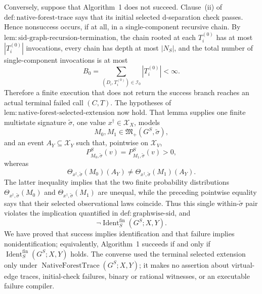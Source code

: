 Conversely, suppose that Algorithm~1 does not succeed.  Clause~(ii) of \(\mathrm{def:native\text{-}forest\text{-}trace}\) says that its initial selected d-separation check passes.  Hence nonsuccess occurs, if at all, in a single-component recursive chain.  By \(\mathrm{lem:sid\text{-}graph\text{-}recursion\text{-}termination}\), the chain rooted at each \(T_i^{(0)}\) has at most \(|T_i^{(0)}|\) invocations, every chain has depth at most \(|N_S|\), and the total number of single-component invocations is at most
\[
 B_0=\sum_{(D_i,T_i^{(0)})\in\mathcal I_0}|T_i^{(0)}|<\infty.
\]
Therefore a finite execution that does not return the success branch reaches an actual terminal failed call \((C,T)\).  The hypotheses of \(\mathrm{lem:native\text{-}forest\text{-}selected\text{-}extension}\) now hold.  That lemma supplies one finite multistate signature \(\widetilde\sigma\), one value \(x^\dagger\in\mathcal X_X\), models
\[
 M_0,M_1\in\mathfrak M_+(G^S,\widetilde\sigma),
\]
and an event \(A_Y\subseteq\mathcal X_Y\) such that, pointwise on \(\mathcal X_V\),
\[
 P_{M_0,\widetilde\sigma}^S(v)
 =P_{M_1,\widetilde\sigma}^S(v)>0,
\]
whereas
\[
 \Theta_{x^\dagger,\widetilde\sigma}(M_0)(A_Y)
 \ne
 \Theta_{x^\dagger,\widetilde\sigma}(M_1)(A_Y).
\]
The latter inequality implies that the two finite probability distributions \(\Theta_{x^\dagger,\widetilde\sigma}(M_0)\) and \(\Theta_{x^\dagger,\widetilde\sigma}(M_1)\) are unequal, while the preceding pointwise equality says that their selected observational laws coincide.  Thus this single within-\(\widetilde\sigma\) pair violates the implication quantified in \(\mathrm{def:graphwise\text{-}sid}\), and
\[
 \neg\operatorname{Ident}^{\mathrm{fin}}_S(G^S;X,Y).
\]
We have proved that success implies identification and that failure implies nonidentification; equivalently, Algorithm~1 succeeds if and only if \(\operatorname{Ident}^{\mathrm{fin}}_S(G^S;X,Y)\) holds.  The converse used the terminal selected extension only under \(\operatorname{NativeForestTrace}(G^S;X,Y)\); it makes no assertion about virtual-edge traces, initial-check failures, binary or rational witnesses, or an executable failure compiler.